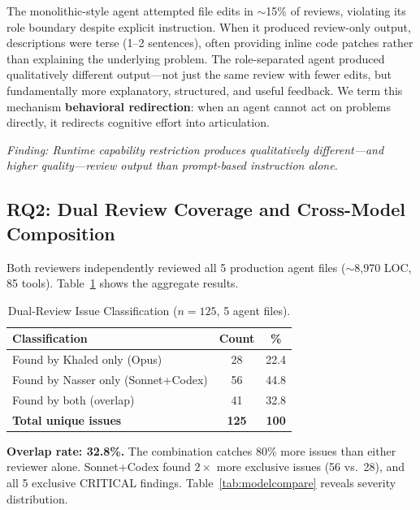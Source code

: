\documentclass[a4paper,USenglish,cleveref,autoref]{lipics-v2021}
\begin{document}
The monolithic-style agent attempted file edits in ${\sim}$15\% of reviews, violating its role boundary despite explicit instruction. When it produced review-only output, descriptions were terse (1--2 sentences), often providing inline code patches rather than explaining the underlying problem. The role-separated agent produced qualitatively different output---not just the same review with fewer edits, but fundamentally more explanatory, structured, and useful feedback. We term this mechanism \textbf{behavioral redirection}: when an agent cannot act on problems directly, it redirects cognitive effort into articulation.

\emph{Finding: Runtime capability restriction produces qualitatively different---and higher quality---review output than prompt-based instruction alone.}

\subsection{RQ2: Dual Review Coverage and Cross-Model Composition}
\label{sec:rq2}

Both reviewers independently reviewed all 5 production agent files (${\sim}$8{,}970 LOC, 85 tools). Table~\ref{tab:dualreview} shows the aggregate results.

\begin{table}[t]
\caption{Dual-Review Issue Classification ($n=125$, 5 agent files).}
\label{tab:dualreview}
\centering
\begin{tabular}{@{}lcc@{}}
\toprule
\textbf{Classification} & \textbf{Count} & \textbf{\%} \\
\midrule
Found by Khaled only (Opus) & 28 & 22.4 \\
Found by Nasser only (Sonnet+Codex) & 56 & 44.8 \\
Found by both (overlap) & 41 & 32.8 \\
\midrule
\textbf{Total unique issues} & \textbf{125} & \textbf{100} \\
\bottomrule
\end{tabular}
\end{table}

\textbf{Overlap rate: 32.8\%.} The combination catches 80\% more issues than either reviewer alone. Sonnet+Codex found $2\times$ more exclusive issues (56 vs.\ 28), and all 5 exclusive CRITICAL findings. Table~\ref{tab:modelcompare} reveals severity distribution.
\end{document}
